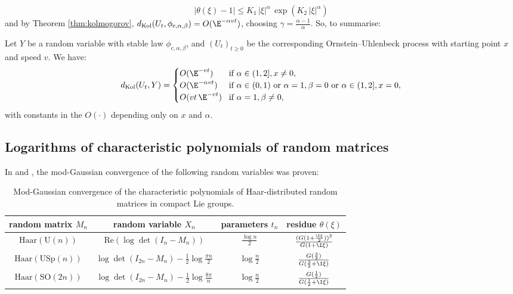 \documentclass[envcountsame]{svmult}
\newcommand{\dkol}{d_\mathrm{Kol}}
\begin{document}
$$|\theta(\xi)-1| \leq K_1\, |\xi|^\alpha\,\exp(K_2\,|\xi|^\alpha) $$
and by Theorem \ref{thm:kolmogorov}, $\dkol(U_t,\phi_{c,\alpha,\beta}) = O(\E^{-\alpha vt})$, choosing $\gamma = \frac{\alpha-1}{\alpha}$. So, to summarise:
\begin{proposition}\label{prop:ornstein}
Let $Y$ be a random variable with stable law $\phi_{c,\alpha,\beta}$, and $(U_t)_{t \geq 0}$ be the corresponding Ornstein--Uhlenbeck process with starting point $x$ and speed $v$. We have:
$$\dkol(U_t,Y) = \begin{cases}
     O(\E^{-vt})\!&\text{if }\alpha \in (1,2],x \neq 0,\\
    O(\E^{-\alpha vt})\!&\text{if }\alpha \in (0,1) \text{ or }\alpha =1,\beta =0 \text{ or }\alpha \in (1,2],x=0,\\
    O(vt\,\E^{-vt})\! &\text{if }\alpha=1,\beta \neq 0,
\end{cases}$$
with constants in the $O(\cdot)$ depending only on $x$ and $\alpha$.
\end{proposition}



\subsection{Logarithms of characteristic polynomials of random matrices}
In \cite[Sections 3 and 4]{KN12} and \cite[Section 7.5]{FMN16}, the mod-Gaussian convergence of the following random variables was proven:
\begin{table}
\begin{center}
\begin{tabular}{|c|c|c|c|}
\hline random matrix $M_n$ & random variable $X_n$ & parameters $t_n$  & residue $\theta(\xi)$ \\
\hline\hline
$\mathrm{Haar}(\mathrm{U}(n))$ & $\mathrm{Re}(\log \det(I_n-M_n))$ & $\frac{\log n}{2}$ & $ \frac{(G(1+\frac{\I \xi}{2}))^2}{G(1+\I \xi)}$\\
$\mathrm{Haar}(\mathrm{USp}(n))$ & $\log \det(I_{2n}-M_n) - \frac{1}{2} \log \frac{\pi n}{2}$ & $\log \frac{n}{2}$   &
$\frac{G(\frac{3}{2})}{G(\frac{3}{2}+\I\xi)}$\\
$\mathrm{Haar}(\mathrm{SO}(2n))$ & $\log \det(I_{2n}-M_{n}) - \frac{1}{2} \log \frac{8\pi}{n}$ & $\log \frac{n}{2}$   & $\frac{G(\frac{1}{2})}{G(\frac{1}{2}+\I\xi)}$\\
\hline
\end{tabular}
\end{center}
\caption{Mod-Gaussian convergence of the characteristic polynomials of Haar-distributed random matrices in compact Lie groups.}
\end{table}
\end{document}
